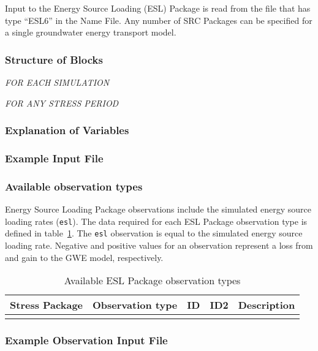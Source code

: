 Input to the Energy Source Loading (ESL) Package is read from the file that has type ``ESL6'' in the Name File.  Any number of SRC Packages can be specified for a single groundwater energy transport model.

\vspace{5mm}
\subsubsection{Structure of Blocks}
\vspace{5mm}

\noindent \textit{FOR EACH SIMULATION}


\vspace{5mm}
\noindent \textit{FOR ANY STRESS PERIOD}

\packageperioddescription

\vspace{5mm}
\subsubsection{Explanation of Variables}
\begin{description}

\end{description}

\vspace{5mm}
\subsubsection{Example Input File}


\vspace{5mm}
\subsubsection{Available observation types}
Energy Source Loading Package observations include the simulated energy source loading rates (\texttt{esl}). The data required for each ESL Package observation type is defined in table~\ref{table:gwe-eslobstype}. The \texttt{esl} observation is equal to the simulated energy source loading rate. Negative and positive values for an observation represent a loss from and gain to the GWE model, respectively.

\begin{longtable}{p{2cm} p{2.75cm} p{2cm} p{1.25cm} p{7cm}}
\caption{Available ESL Package observation types} \tabularnewline

\hline
\hline
\textbf{Stress Package} & \textbf{Observation type} & \textbf{ID} & \textbf{ID2} & \textbf{Description} \\
\hline
\endhead

\hline
\endfoot


\label{table:gwe-eslobstype}
\end{longtable}

\vspace{5mm}
\subsubsection{Example Observation Input File}

